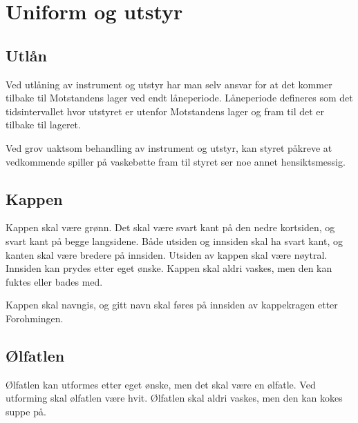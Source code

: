 \section{Uniform og utstyr}
    \subsection{Utlån}
        \begin{statute}
            Ved utlåning av instrument og utstyr har man selv ansvar for at det kommer tilbake til Motstandens lager ved endt låneperiode. Låneperiode defineres som det tidsintervallet hvor utstyret er utenfor Motstandens lager og fram til det er tilbake til lageret.
        \end{statute}
        \begin{statute}
            Ved grov uaktsom behandling av instrument og utstyr, kan styret påkreve at vedkommende spiller på vaskebøtte fram til styret ser noe annet hensiktsmessig. 
        \end{statute}

    \subsection{Kappen}
            \begin{statute}
                Kappen skal være grønn. Det skal være svart kant på den nedre kortsiden, og svart kant på begge langsidene. Både utsiden og innsiden skal ha svart kant, og kanten skal være bredere på innsiden. Utsiden av kappen skal være nøytral. Innsiden kan prydes etter eget ønske. Kappen skal aldri vaskes, men den kan fuktes eller bades med.
            \end{statute}

            \begin{statute}
                Kappen skal navngis, og gitt navn skal føres på innsiden av kappekragen etter Forohmingen.
            \end{statute}

    \subsection{Ølfatlen}
        \begin{statute}
            Ølfatlen kan utformes etter eget ønske, men det skal være en ølfatle. Ved utforming skal ølfatlen være hvit. Ølfatlen skal aldri vaskes, men den kan kokes suppe på.
        \end{statute}
        
